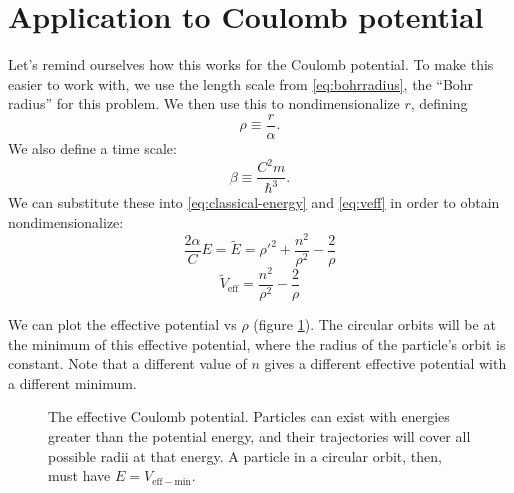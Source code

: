 \documentclass[12pt,twoside]{reedthesis}
\newcommand{\eqn}[1]{\begin{equation}#1\end{equation}}
\begin{document}
\section{Application to Coulomb potential}
Let's remind ourselves how this works for the Coulomb potential. To make this easier to work with, we use the length scale from \eqref{eq:bohrradius}, the ``Bohr radius'' for this problem. We then use this to nondimensionalize $r$, defining
\begin{equation}
\rho \equiv \frac{r}{\alpha}\mbox{.}
\label{eq:rho}
\end{equation}
We also define a time scale:
\begin{equation}
\beta \equiv \frac{C^2m}{\hbar^3}\mbox{.}
\label{eq:beta}
\end{equation}
We can substitute these into \eqref{eq:classical-energy} and \eqref{eq:veff} in order to obtain nondimensionalize:
\eqn{
\frac{2 \alpha}{C}E = \tilde{E}= \rho '^2 + \frac{n^2}{\rho^2}-\frac{2}{\rho}
\label{eq:energy-nondim}
}
\eqn{
\tilde{V}_{\mathrm{eff}} = \frac{n^2}{\rho^2}-\frac{2}{\rho}
\label{eq:veff-nondim}
}

We can plot the effective potential vs $\rho$ (figure \ref{fig:hveff}). The circular orbits will be at the minimum of this effective potential, where the radius of the particle's orbit is constant. Note that a different value of $n$ gives a different effective potential with a different minimum. 

\begin{figure}[h]
\caption[The effective Coulomb potential]{The effective Coulomb potential. Particles can exist with energies greater than the potential energy, and their trajectories will cover all possible radii at that energy. A particle in a circular orbit, then, must have $E = V_{\mathrm{eff-min}}$.}
\label{fig:hveff}
\end{figure}
\end{document}

